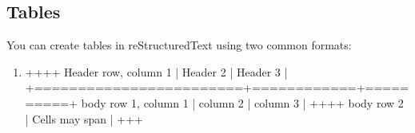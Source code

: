 \documentclass[a4paper,10pt,english]{sphinxmanual}
\begin{document}
\subsection{Tables}
\label{\detokenize{page_two:tables}}
\sphinxAtStartPar
You can create tables in reStructuredText using two common formats:
\begin{enumerate}
%
\item {} 
\sphinxAtStartPar
{}

\begin{sphinxVerbatim}[commandchars=\\\{\}]
+\PYGZhy{}\PYGZhy{}\PYGZhy{}\PYGZhy{}\PYGZhy{}\PYGZhy{}\PYGZhy{}\PYGZhy{}\PYGZhy{}\PYGZhy{}\PYGZhy{}\PYGZhy{}\PYGZhy{}\PYGZhy{}\PYGZhy{}\PYGZhy{}\PYGZhy{}\PYGZhy{}\PYGZhy{}\PYGZhy{}\PYGZhy{}\PYGZhy{}\PYGZhy{}\PYGZhy{}+\PYGZhy{}\PYGZhy{}\PYGZhy{}\PYGZhy{}\PYGZhy{}\PYGZhy{}\PYGZhy{}\PYGZhy{}\PYGZhy{}\PYGZhy{}\PYGZhy{}\PYGZhy{}+\PYGZhy{}\PYGZhy{}\PYGZhy{}\PYGZhy{}\PYGZhy{}\PYGZhy{}\PYGZhy{}\PYGZhy{}\PYGZhy{}\PYGZhy{}+
 Header row, column 1   | Header 2   | Header 3 |
+========================+============+==========+
 body row 1, column 1   | column 2   | column 3 |
+\PYGZhy{}\PYGZhy{}\PYGZhy{}\PYGZhy{}\PYGZhy{}\PYGZhy{}\PYGZhy{}\PYGZhy{}\PYGZhy{}\PYGZhy{}\PYGZhy{}\PYGZhy{}\PYGZhy{}\PYGZhy{}\PYGZhy{}\PYGZhy{}\PYGZhy{}\PYGZhy{}\PYGZhy{}\PYGZhy{}\PYGZhy{}\PYGZhy{}\PYGZhy{}\PYGZhy{}+\PYGZhy{}\PYGZhy{}\PYGZhy{}\PYGZhy{}\PYGZhy{}\PYGZhy{}\PYGZhy{}\PYGZhy{}\PYGZhy{}\PYGZhy{}\PYGZhy{}\PYGZhy{}+\PYGZhy{}\PYGZhy{}\PYGZhy{}\PYGZhy{}\PYGZhy{}\PYGZhy{}\PYGZhy{}\PYGZhy{}\PYGZhy{}\PYGZhy{}+
 body row 2             | Cells may span        |
+\PYGZhy{}\PYGZhy{}\PYGZhy{}\PYGZhy{}\PYGZhy{}\PYGZhy{}\PYGZhy{}\PYGZhy{}\PYGZhy{}\PYGZhy{}\PYGZhy{}\PYGZhy{}\PYGZhy{}\PYGZhy{}\PYGZhy{}\PYGZhy{}\PYGZhy{}\PYGZhy{}\PYGZhy{}\PYGZhy{}\PYGZhy{}\PYGZhy{}\PYGZhy{}\PYGZhy{}+\PYGZhy{}\PYGZhy{}\PYGZhy{}\PYGZhy{}\PYGZhy{}\PYGZhy{}\PYGZhy{}\PYGZhy{}\PYGZhy{}\PYGZhy{}\PYGZhy{}\PYGZhy{}\PYGZhy{}\PYGZhy{}\PYGZhy{}\PYGZhy{}\PYGZhy{}\PYGZhy{}\PYGZhy{}\PYGZhy{}\PYGZhy{}\PYGZhy{}\PYGZhy{}+
\end{sphinxVerbatim}

\end{enumerate}
\end{document}

